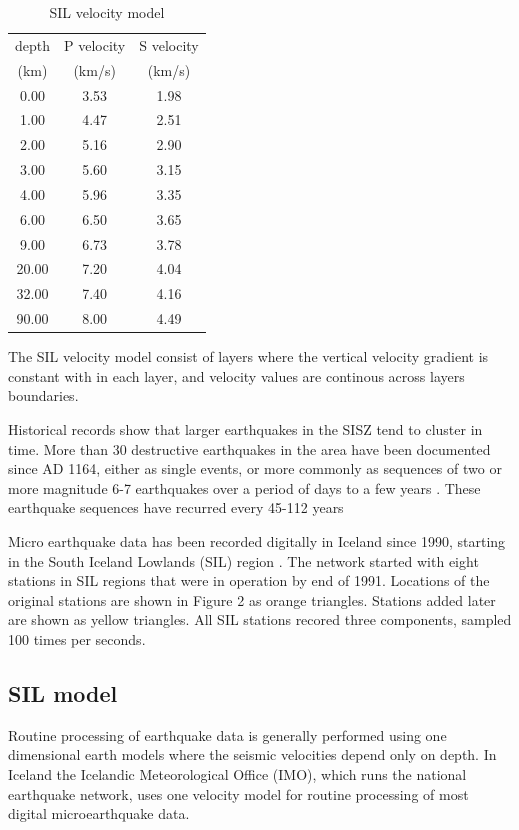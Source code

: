 \documentclass[extra]{gji}
\begin{document}
\begin{table}
\caption{SIL velocity model}
	\begin{center}
\begin{tabular}{ccc}
depth & P velocity & S velocity \\
(km) & (km/s) & (km/s) \\
0.00 & 3.53 & 1.98 \\
1.00 & 4.47 & 2.51 \\
2.00 & 5.16 & 2.90 \\
3.00 & 5.60 & 3.15 \\
4.00 & 5.96 & 3.35 \\
6.00 & 6.50 & 3.65 \\
9.00 & 6.73 & 3.78 \\
20.00 & 7.20 & 4.04 \\
32.00 & 7.40 & 4.16 \\
90.00 & 8.00 & 4.49 \\
	\end{tabular}
\end{center}

The SIL velocity model consist of layers where the vertical velocity gradient
is constant with in each layer, and velocity values are continous across layers
boundaries.

\end{table}

Historical records show
that larger earthquakes in the SISZ tend to cluster in
time. More than 30 destructive earthquakes in
the area have been documented since AD 1164,
either as single events, or more commonly as sequences 
of two or more magnitude 6-7 earthquakes over a 
period of days to a few years 
\citep{pe91}.
These earthquake sequences have recurred every 45-112
years 

Micro earthquake data has been recorded digitally in Iceland since 1990,
starting in the South Iceland Lowlands (SIL) region \citep{sil99}.
The network started with 
eight stations in SIL regions that were in operation by end of 1991.
Locations of the original stations are shown in Figure 2 as orange triangles.
Stations added later are shown as yellow triangles.
All SIL stations recored three components, sampled 100 times per seconds. 


\subsection{SIL model}

Routine processing of earthquake data is generally performed using one
dimensional earth models where the seismic velocities depend only on
depth. In Iceland the Icelandic Meteorological Office (IMO), which runs the
national earthquake network, uses one velocity model for routine
processing of most digital microearthquake data. 
\end{document}
